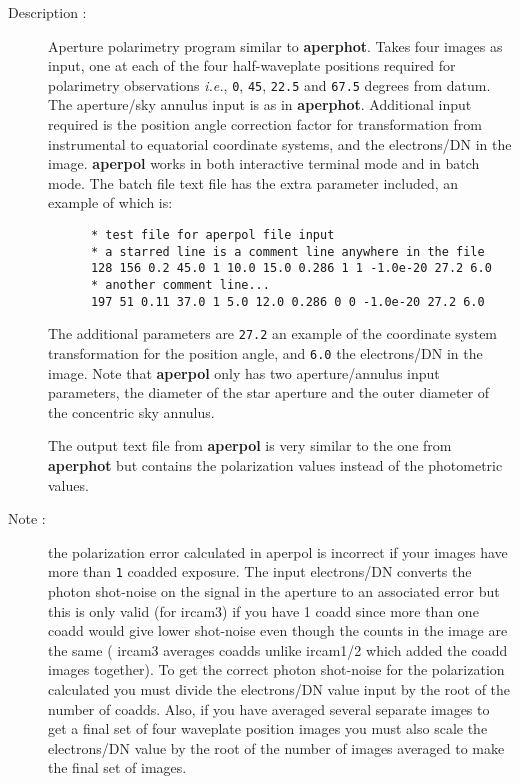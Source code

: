 \begin{description}

\item[Description :] Aperture polarimetry program similar to {\bf
aperphot}.  Takes four images as input, one at each of the four
half-waveplate positions required for polarimetry observations
\emph{i.e.}, {\tt 0}, {\tt 45}, {\tt 22.5} and {\tt 67.5} degrees from
datum.  The aperture/sky annulus input is as in {\bf aperphot}.
Additional input required is the position angle correction factor for
transformation from instrumental to equatorial coordinate systems, and
the electrons/DN in the image.  {\bf aperpol} works in both interactive
terminal mode and in batch mode.  The batch file text file has the
extra parameter included, an example of which is:

\begin{small}
\begin{verbatim}
      * test file for aperpol file input
      * a starred line is a comment line anywhere in the file
      128 156 0.2 45.0 1 10.0 15.0 0.286 1 1 -1.0e-20 27.2 6.0
      * another comment line...
      197 51 0.11 37.0 1 5.0 12.0 0.286 0 0 -1.0e-20 27.2 6.0
\end{verbatim}
\end{small}

The additional parameters are {\tt 27.2} an example of the coordinate
system transformation for the position angle, and {\tt 6.0} the
electrons/DN in the image.  Note that {\bf aperpol} only has two
aperture/annulus input parameters, the diameter of the star aperture
and the outer diameter of the concentric sky annulus.

The output text file from {\bf aperpol} is very similar to the one from
{\bf aperphot} but contains the polarization values instead of the
photometric values.

\item[Note :] the polarization error calculated in aperpol is incorrect
if your images have more than {\tt 1} coadded exposure.  The input
electrons/DN converts the photon shot-noise on the signal in the
aperture to an associated error but this is only valid (for {\sc
ircam3}) if you have 1 coadd since more than one coadd would give lower
shot-noise even though the counts in the image are the same ({\sc
ircam3} averages coadds unlike {\sc ircam1/2} which added the coadd
images together).  To get the correct photon shot-noise for the
polarization calculated you must divide the electrons/DN value input by
the root of the number of coadds.  Also, if you have averaged several
separate images to get a final set of four waveplate position images
you must also scale the electrons/DN value by the root of the number of
images averaged to make the final set of images.


\end{description}
